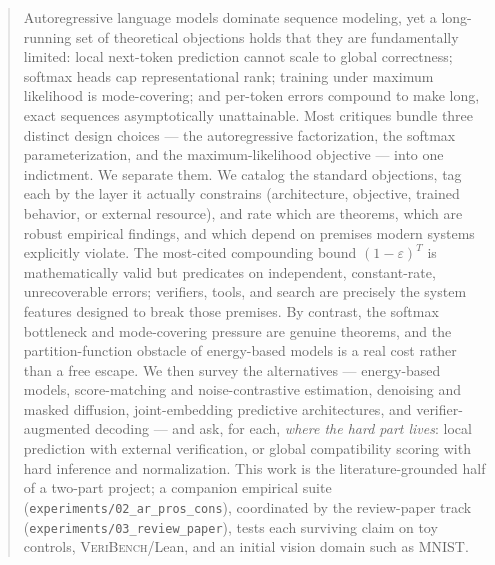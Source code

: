 %

\begin{abstract}
Autoregressive language models dominate sequence modeling, yet a long-running set of theoretical objections holds that they are fundamentally limited:
local next-token prediction cannot scale to global correctness;
softmax heads cap representational rank;
training under maximum likelihood is mode-covering;
and per-token errors compound to make long, exact sequences asymptotically unattainable.
Most critiques bundle three distinct design choices --- the autoregressive factorization, the softmax parameterization, and the maximum-likelihood objective --- into one indictment.
We separate them.
We catalog the standard objections, tag each by the layer it actually constrains (architecture, objective, trained behavior, or external resource), and rate which are theorems, which are robust empirical findings, and which depend on premises modern systems explicitly violate.
The most-cited compounding bound $(1-\varepsilon)^T$ is mathematically valid but predicates on independent, constant-rate, unrecoverable errors;
verifiers, tools, and search are precisely the system features designed to break those premises.
By contrast, the softmax bottleneck and mode-covering pressure are genuine theorems, and the partition-function obstacle of energy-based models is a real cost rather than a free escape.
We then survey the alternatives --- energy-based models, score-matching and noise-contrastive estimation, denoising and masked diffusion, joint-embedding predictive architectures, and verifier-augmented decoding --- and ask, for each, \emph{where the hard part lives}: local prediction with external verification, or global compatibility scoring with hard inference and normalization.
This work is the literature-grounded half of a two-part project;
a companion empirical suite (\texttt{experiments/02\_ar\_pros\_cons}), coordinated by the review-paper track (\texttt{experiments/03\_review\_paper}), tests each surviving claim on toy controls, \textsc{VeriBench}/Lean, and an initial vision domain such as \textsc{MNIST}.
\end{abstract}
